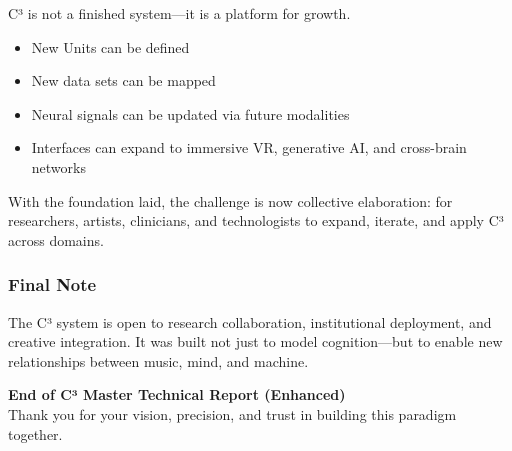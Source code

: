 \documentclass[10pt]{article}
\begin{document}
C³ is not a finished system—it is a platform for growth.

\begin{itemize}
    \item New Units can be defined
    \item New data sets can be mapped
    \item Neural signals can be updated via future modalities
    \item Interfaces can expand to immersive VR, generative AI, and cross-brain networks
\end{itemize}

With the foundation laid, the challenge is now collective elaboration: for researchers, artists, clinicians, and technologists to expand, iterate, and apply C³ across domains.

\subsubsection*{Final Note}

The C³ system is open to research collaboration, institutional deployment, and creative integration. It was built not just to model cognition—but to enable new relationships between music, mind, and machine.

\vspace{1cm}
\begin{center}
\Large \textbf{End of C³ Master Technical Report (Enhanced)}\\[0.2cm]
\large Thank you for your vision, precision, and trust in building this paradigm together.
\end{center}
\end{document}
